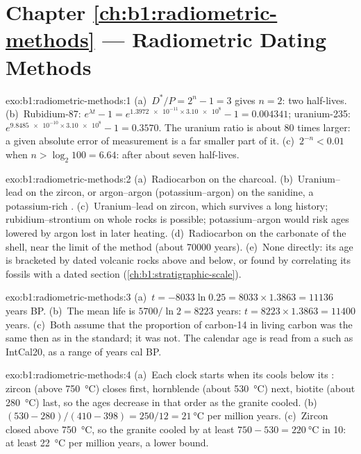\section*{Chapter \ref{ch:b1:radiometric-methods} --- Radiometric Dating Methods}

\begin{solution}{exo:b1:radiometric-methods:1}
(a)~$D^*/P = 2^n - 1 = 3$ gives $n = 2$: two half-lives. (b)~Rubidium-87:
$e^{\lambda t} - 1 = e^{\num{1.3972e-11} \times \num{3.10e8}} - 1 = 0.004341$;
uranium-235: $e^{\num{9.8485e-10} \times \num{3.10e8}} - 1 = 0.3570$. The
uranium ratio is about 80 times larger: a given absolute error of measurement is
a far smaller part of it. (c)~$2^{-n} < 0.01$ when $n > \log_2 100 = 6.64$: after
about seven half-lives.
\end{solution}

\begin{solution}{exo:b1:radiometric-methods:2}
(a)~Radiocarbon on the charcoal. (b)~Uranium--lead on the zircon, or
argon--argon (potassium--argon) on the sanidine, a potassium-rich .
(c)~Uranium--lead on zircon, which survives a long history; rubidium--strontium
on whole rocks is possible; potassium--argon would risk ages lowered by argon
lost in later heating. (d)~Radiocarbon on the carbonate of the shell, near the
limit of the method (about \num{70000} years). (e)~None directly: its age is
bracketed by dated volcanic rocks above and below, or found by correlating its
fossils with a dated section (\cref{ch:b1:stratigraphic-scale}).
\end{solution}

\begin{solution}{exo:b1:radiometric-methods:3}
(a)~$t = -8033 \ln 0.25 = 8033 \times 1.3863 = \num{11136}$ years BP.
(b)~The mean life is $5700/\ln 2 = \num{8223}$ years: $t = 8223 \times 1.3863 =
\num{11400}$ years. (c)~Both assume that the proportion of carbon-14 in living
carbon was the same then as in the standard; it was not. The calendar age is read
from a  such as IntCal20, as a range of years cal BP.
\end{solution}

\begin{solution}{exo:b1:radiometric-methods:4}
(a)~Each clock starts when its  cools below its :
zircon (above \qty{750}{\celsius}) closes first, hornblende (about
\qty{530}{\celsius}) next, biotite (about \qty{280}{\celsius}) last, so the ages
decrease in that order as the granite cooled. (b)~$(530 - 280)/(410 - 398) =
250/12 = \qty{21}{\celsius}$ per million years. (c)~Zircon closed above
\qty{750}{\celsius}, so the granite cooled by at least $750 - 530 =
\qty{220}{\celsius}$ in \qty{10}{\Myr}: at least \qty{22}{\celsius} per million
years, a lower bound.
\end{solution}

